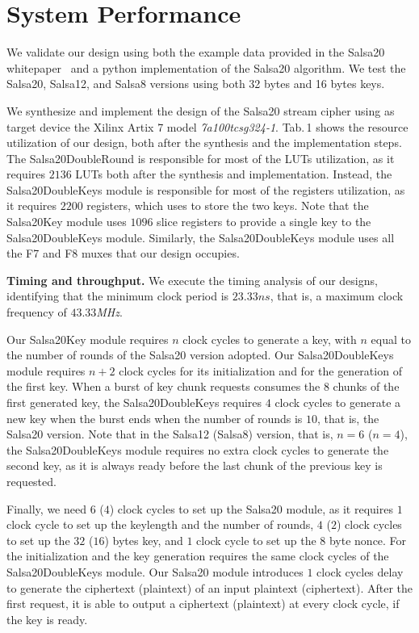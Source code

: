 \documentclass[letterpaper, 10pt, oneside]{article}
\newcommand{\fakepar}[1]{\vspace{0.5mm}\noindent\textbf{#1.}}
\begin{document}
\section{System Performance}
We validate our design using both the example data provided in the Salsa20 whitepaper~\cite{salsa20} and a python implementation of the Salsa20 algorithm.
We test the Salsa20, Salsa12, and Salsa8 versions using both 32 bytes and 16 bytes keys.

We synthesize and implement the design of the Salsa20 stream cipher using as target device the Xilinx Artix 7 model \textit{7a100tcsg324-1}.
Tab.\,1 shows the resource utilization of our design, both after the synthesis and the implementation steps.
The Salsa20DoubleRound is responsible for most of the LUTs utilization, as it requires $2136$ LUTs both after the synthesis and implementation.
Instead, the Salsa20DoubleKeys module is responsible for most of the registers utilization, as it requires $2200$ registers, which uses to store the two keys.
Note that the Salsa20Key module uses $1096$ slice registers to provide a single key to the Salsa20DoubleKeys module.
Similarly, the Salsa20DoubleKeys module uses all the F7 and F8 muxes that our design occupies.

\fakepar{Timing and throughput}
We execute the timing analysis of our designs, identifying that the minimum clock period is $23.33ns$, that is, a maximum clock frequency of $43.33$\textit{MHz}.

Our Salsa20Key module requires $n$ clock cycles to generate a key, with $n$ equal to the number of rounds of the Salsa20 version adopted.
Our Salsa20DoubleKeys module requires $n+2$ clock cycles for its initialization and for the generation of the first key. 
When a burst of key chunk requests consumes the $8$ chunks of the first generated key, the Salsa20DoubleKeys requires $4$ clock cycles to generate a new key when the burst ends when the number of rounds is $10$, that is, the Salsa20 version.
Note that in the Salsa12 (Salsa8) version, that is, $n = 6$ ($n = 4$), the Salsa20DoubleKeys module requires no extra clock cycles to generate the second key, as it is always ready before the last chunk of the previous key is requested.

Finally, we need $6$ ($4$) clock cycles to set up the Salsa20 module, as it requires $1$ clock cycle to set up the keylength and the number of rounds, $4$ ($2$) clock cycles to set up the $32$ ($16$) bytes key, and $1$ clock cycle to set up the $8$ byte nonce.
For the initialization and the key generation requires the same clock cycles of the Salsa20DoubleKeys module.
Our Salsa20 module introduces $1$ clock cycles delay to generate the ciphertext (plaintext) of an input plaintext (ciphertext).
After the first request, it is able to output a ciphertext (plaintext) at every clock cycle, if the key is ready.



\end{document}
